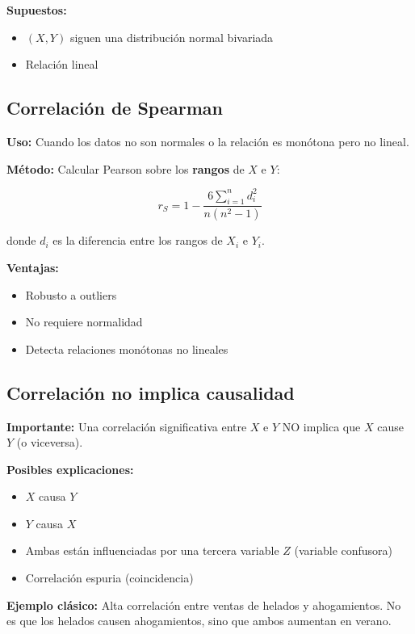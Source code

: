 \documentclass[11pt,a4paper]{article}
\begin{document}
\textbf{Supuestos:}
\begin{itemize}
    \item $(X, Y)$ siguen una distribución normal bivariada
    \item Relación lineal
\end{itemize}

\subsection{Correlación de Spearman}

\textbf{Uso:} Cuando los datos no son normales o la relación es monótona pero no lineal.

\textbf{Método:} Calcular Pearson sobre los \textbf{rangos} de $X$ e $Y$:

\begin{equation}
r_S = 1 - \frac{6 \sum_{i=1}^{n} d_i^2}{n(n^2 - 1)}
\end{equation}

donde $d_i$ es la diferencia entre los rangos de $X_i$ e $Y_i$.

\textbf{Ventajas:}
\begin{itemize}
    \item Robusto a outliers
    \item No requiere normalidad
    \item Detecta relaciones monótonas no lineales
\end{itemize}

\subsection{Correlación no implica causalidad}

\textbf{Importante:} Una correlación significativa entre $X$ e $Y$ NO implica que $X$ cause $Y$ (o viceversa).

\textbf{Posibles explicaciones:}
\begin{itemize}
    \item $X$ causa $Y$
    \item $Y$ causa $X$
    \item Ambas están influenciadas por una tercera variable $Z$ (variable confusora)
    \item Correlación espuria (coincidencia)
\end{itemize}

\textbf{Ejemplo clásico:} Alta correlación entre ventas de helados y ahogamientos. No es que los helados causen ahogamientos, sino que ambos aumentan en verano.
\end{document}
